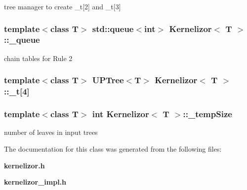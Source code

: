 tree manager to create \_\-t[2] and \_\-t[3] 

\subsubsection{\setlength{\rightskip}{0pt plus 5cm}template$<$class T$>$ std::queue$<$int$>$ {\bf Kernelizor}$<$ T $>$::{\bf \_\-queue}\hspace{0.3cm}{\tt  [protected]}}\label{classKernelizor_p9}


chain tables for Rule 2 

\subsubsection{\setlength{\rightskip}{0pt plus 5cm}template$<$class T$>$ {\bf UPTree}$<$T$>$ {\bf Kernelizor}$<$ T $>$::{\bf \_\-t}[4]\hspace{0.3cm}{\tt  [protected]}}\label{classKernelizor_p0}


\subsubsection{\setlength{\rightskip}{0pt plus 5cm}template$<$class T$>$ int {\bf Kernelizor}$<$ T $>$::{\bf \_\-temp\-Size}\hspace{0.3cm}{\tt  [protected]}}\label{classKernelizor_p3}


number of leaves in input trees 



The documentation for this class was generated from the following files:\begin{CompactItemize}
\item 
{\bf kernelizor.h}\item 
{\bf kernelizor\_\-impl.h}\end{CompactItemize}
